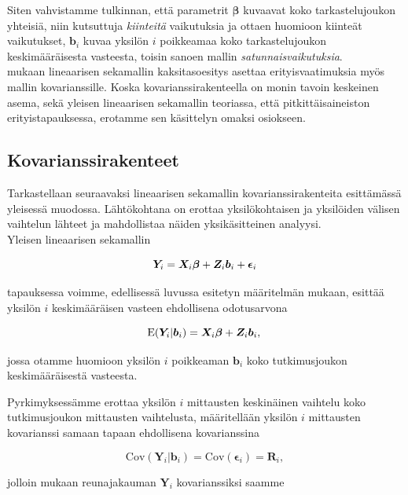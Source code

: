 \documentclass[finnish]{docopts}
\begin{document}
Siten vahvistamme tulkinnan, että parametrit $\bm{\beta}$ kuvaavat koko tarkastelujoukon yhteisiä, niin kutsuttuja \textit{kiinteitä} vaikutuksia ja ottaen huomioon kiinteät vaikutukset, $\bm{b}_i$ kuvaa yksilön $i$ poikkeamaa koko tarkastelujoukon keskimääräisesta vasteesta, toisin sanoen mallin \textit{satunnaisvaikutuksia}. \\

\cite{fitzmaurice11} mukaan lineaarisen sekamallin kaksitasoesitys asettaa erityisvaatimuksia myös mallin kovarianssille. Koska kovarianssirakenteella on monin tavoin keskeinen asema, sekä yleisen lineaarisen sekamallin teoriassa, että pitkittäisaineiston erityistapauksessa, erotamme sen käsittelyn omaksi osiokseen.\\ 

\subsection{Kovarianssirakenteet}
\label{sub:kovarianssirakenteet}

Tarkastellaan seuraavaksi lineaarisen sekamallin kovarianssirakenteita \cite{fitzmaurice11} esittämässä yleisessä muodossa. Lähtökohtana on erottaa yksilökohtaisen ja yksilöiden välisen vaihtelun lähteet ja mahdollistaa näiden yksikäsitteinen analyysi.\\

Yleisen lineaarisen sekamallin

$$
\bm{Y}_i = \bm{X}_i \bm{\beta} + \bm{Z}_i \bm{b}_i + \bm{\epsilon}_i \\
$$

tapauksessa voimme, edellisessä luvussa esitetyn määritelmän mukaan, esittää yksilön $i$ keskimääräisen vasteen ehdollisena odotusarvona

$$
\text{E}(\bm{Y}_i | \bm{b}_i) = \bm{X}_i \bm{\beta} + \bm{Z}_i \bm{b}_i, \\
$$

jossa otamme huomioon yksilön $i$ poikkeaman $\bm{b}_i$ koko tutkimusjoukon keskimääräisestä vasteesta.

Pyrkimyksessämme erottaa yksilön $i$ mittausten keskinäinen vaihtelu koko tutkimusjoukon mittausten vaihtelusta, määritellään yksilön $i$ mittausten kovarianssi samaan tapaan ehdollisena kovarianssina 

$$
\text{Cov}(\bm{Y}_i | \bm{b}_i) = \text{Cov}(\bm{\epsilon}_i) = \bm{R}_i,
$$

jolloin \cite{fitzmaurice11} mukaan reunajakauman $\bm{Y}_i$ kovarianssiksi saamme
\end{document}
